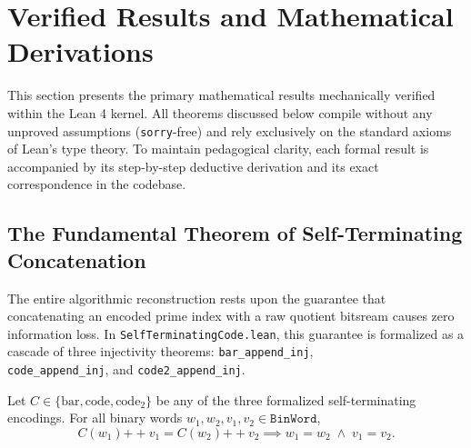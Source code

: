 \documentclass[acmsmall,natbib=false,nonacm]{acmart}
\begin{document}

\section{Verified Results and Mathematical Derivations}
\label{sec:results}

This section presents the primary mathematical results mechanically verified within the Lean 4 kernel. All theorems discussed below compile without any unproved assumptions (\texttt{sorry}-free) and rely exclusively on the standard axioms of Lean's type theory. To maintain pedagogical clarity, each formal result is accompanied by its step-by-step deductive derivation and its exact correspondence in the codebase.

\subsection{The Fundamental Theorem of Self-Terminating Concatenation}
The entire algorithmic reconstruction rests upon the guarantee that concatenating an encoded prime index with a raw quotient bitsream causes zero information loss. In \texttt{SelfTerminatingCode.lean}, this guarantee is formalized as a cascade of three injectivity theorems: \texttt{bar\_append\_inj}, \\ \texttt{code\_append\_inj}, and \texttt{code2\_append\_inj}.

\begin{theorem}
\label{thm:prefix_free_inj}
Let $C \in \{\text{bar}, \text{code}, \text{code}_2\}$ be any of the three formalized self-terminating encodings. For all binary words $w_1, w_2, v_1, v_2 \in \texttt{BinWord}$,
\begin{equation}
    C(w_1) \mathbin{+\!+} v_1 = C(w_2) \mathbin{+\!+} v_2 \implies w_1 = w_2 \;\wedge\; v_1 = v_2.
\end{equation}
\end{theorem}
\end{document}
